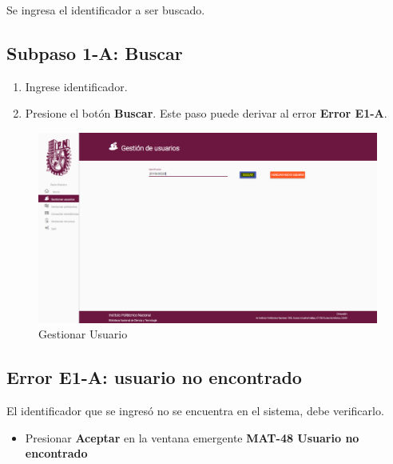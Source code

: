 Se ingresa el identificador a ser buscado.
\subsection{Subpaso 1-A: Buscar }
\begin{enumerate}
	\item Ingrese identificador.
	\item Presione el botón \textbf{Buscar}. Este paso puede derivar
		al error \textbf{Error E1-A}.

\end{enumerate}

\begin{figure}[hbtp]
		\centering
		\includegraphics[scale=0.3]{images/Interfaz/IUGS22_gestionarUsuarioBuscar.png}
		\caption{Gestionar Usuario}
	\end{figure}

\subsection{Error E1-A: usuario no encontrado}
El identificador que se ingresó no se encuentra  en el sistema,
debe verificarlo.
\begin{itemize}
	\item Presionar \textbf{Aceptar} en la ventana emergente 
		\textbf{MAT-48 Usuario no encontrado}
		


\end{itemize}
